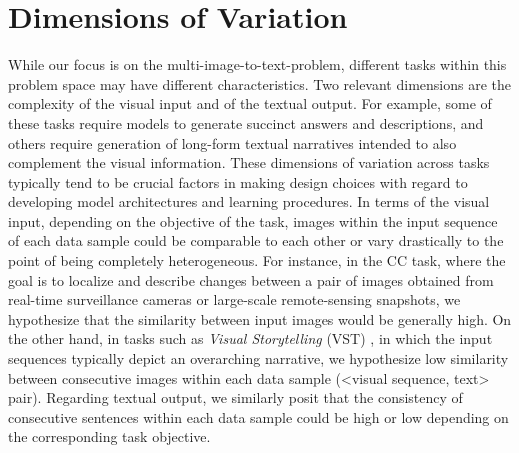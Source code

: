 \section{Dimensions of Variation}
\label{sec:tasks_and_analysis}

While our focus is on the multi-image-to-text-problem, different tasks within this problem space may have different characteristics. Two relevant dimensions are the complexity of the visual input and of the textual output. For example, some of these tasks require models to generate succinct answers and descriptions, and others require generation of long-form textual narratives intended to also complement the visual information. These dimensions of variation across tasks typically tend to be crucial factors in making design choices with regard to developing model architectures and learning procedures. In terms of the visual input, depending on the objective of the task, images within the input sequence of each data sample could be comparable to each other or vary drastically to the point of being completely heterogeneous. For instance, in the \color{xkcdVividBlue}CC \color{black}task, where the goal is to localize and describe changes between a pair of images obtained from real-time surveillance cameras or large-scale remote-sensing snapshots, we hypothesize that the similarity between input images would be generally high. On the other hand, in tasks such as \textit{Visual Storytelling} (\color{xkcdVividBlue}VST\color{black}) \cite{vist}, in which the input sequences typically depict an overarching narrative, we hypothesize low similarity between consecutive images within each data sample (<visual sequence, text> pair). Regarding textual output, we similarly posit that the consistency of consecutive sentences within each data sample could be high or low depending on the corresponding task objective.

